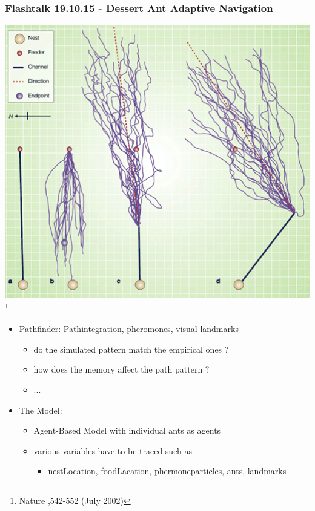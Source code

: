 \documentclass[ignorenonframetext]{beamer}
\begin{document}
\hfill%
\begin{frame} 
\frametitle{Flashtalk 19.10.15 - Dessert Ant Adaptive Navigation} 
\includegraphics[scale=0.2]{nature.png}\\
\footnote{Nature ,542-552 (July 2002)  }

\begin{itemize}
	\item Pathfinder: Pathintegration, pheromones, visual landmarks 
	\begin{itemize}
	\item do the simulated pattern match the empirical ones ?
	\item how does the memory affect the path pattern ?
	\item ...
	\end{itemize}
\item The Model:
	\begin{itemize}
	\item Agent-Based Model with individual ants as agents
	\item various variables have to be traced such as
		\begin{itemize}
		\item nestLocation, foodLacation, phermoneparticles, ants, landmarks
		\end{itemize}
	
	\end{itemize}
\end{itemize}
\end{frame} 
\end{document}
